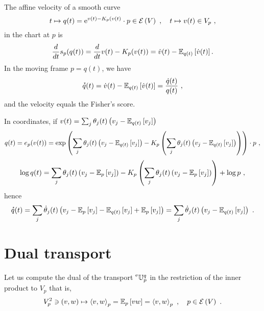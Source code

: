\documentclass[12pt,a4paper]{amsart}
\begin{document}
 The affine velocity of a smooth curve 
 \begin{equation}
 t \mapsto q(t) = \mathrm{e}^{v(t) - K_p(v(t)} \cdot p \in \operatorname{\mathcal E}\left(V\right) \ , \quad t \mapsto v(t) \in V_p \ ,    
 \end{equation} in the chart at $p$ is 
 \begin{equation}
     \frac{d}{dt} s_p(q(t)) = \frac{d}{dt} v(t) - K_p(v(t)) = \dot v(t) - \operatorname{\mathbb E}_{q(t)}\left[\dot v(t)\right]  .
 \end{equation}
 In the moving frame $p = q(t)$, we have
 \begin{equation}
   \accentset{\star}{q}(t) = \dot v(t)- \operatorname{\mathbb E}_{q(t)}\left[\dot v(t)\right] =  \frac {\dot q(t)} {q(t)} \ , \end{equation}
 and the velocity equals the Fisher's score.

 In coordinates, if $v(t) = \sum_j \theta_j(t) \left(v_j - \operatorname{\mathbb E}_{q(t)}\left[v_j\right]\right)$
 \begin{equation}
   \label{eq:1}
   q(t) = e_p(v(t)) = \exp\left(\sum_j \theta_j(t) \left(v_j - \operatorname{\mathbb E}_{q(t)}\left[v_j\right]\right) - K_p\left(\sum_j \theta_j(t) \left(v_j - \operatorname{\mathbb E}_{q(t)}\left[v_j\right]\right)\right)\right) \cdot p \ ,
 \end{equation}
 \begin{equation}
   \label{eq:2}
   \log q(t) = \sum_j \theta_j(t) \left(v_j - \operatorname{\mathbb E}_{p}\left[v_j\right]\right) - K_p\left(\sum_j \theta_j(t) \left(v_j - \operatorname{\mathbb E}_{p}\left[v_j\right]\right)\right) + \log p \ ,
 \end{equation}
hence
   \begin{equation}
   \accentset{\star}{q}(t) = \sum_j \dot \theta_j(t) \left(v_j - \operatorname{\mathbb E}_{p}\left[v_j\right] - \operatorname{\mathbb E}_{q(t)}\left[v_j\right] + \operatorname{\mathbb E}_{p}\left[v_j\right]\right) = \sum_j \dot \theta_j(t) \left(v_j - \operatorname{\mathbb E}_{q(t)}\left[v_j\right]\right) \ .
   \end{equation}

\section{Dual transport}

Let us compute the dual of the transport $\prescript{\text{e}}{} {\mathbb U} _ {p} ^ {q}$ in the restriction of the inner product to $V_p$ that is, 
\begin{equation}
V_p^2 \ni (v,w) \mapsto \scalarat p v w = \expectat p {vw} = \scalarat p v w \ , \quad p \in \maxexpat V \ . 
\end{equation}
\end{document}
